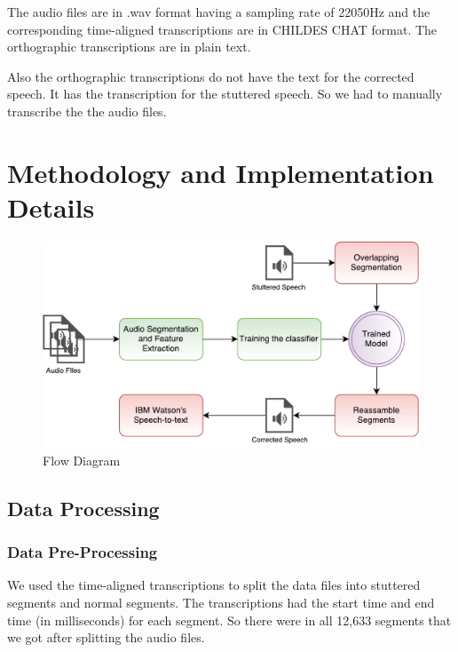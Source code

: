 \documentclass{report}
\begin{document}
The audio files are in .wav format having a sampling rate of 22050Hz and the corresponding time-aligned transcriptions are in CHILDES CHAT \cite{childes} format. The orthographic transcriptions are in plain text.

Also the orthographic transcriptions do not have the text for the corrected speech. It has the transcription for the stuttered speech. So we had to manually transcribe the the audio files.

\chapter{Methodology and Implementation Details}

\begin{figure}[ht]
    \centering
    \includegraphics[scale=0.70]{FlowDiagram.pdf}
    \caption{Flow Diagram}
    \label{fig:flowdiagram}
\end{figure}

\section{Data Processing}
\subsection{Data Pre-Processing}
We used the time-aligned transcriptions to split the data files into stuttered segments and normal segments. The transcriptions had the start time and end time (in milliseconds) for each segment. So there were in all 12,633 segments that we got after splitting the audio files.
\end{document}
